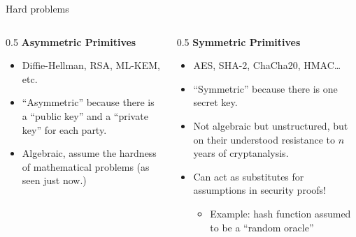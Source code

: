 \documentclass[aspectratio=169, lualatex, handout]{beamer}
\begin{document}
	\begin{frame}{Hard problems}
		\begin{columns}[c]
			\begin{column}{0.5\textwidth}
				\textbf{Asymmetric Primitives}
				\begin{itemize}
					\pause

					\item Diffie-Hellman, RSA, ML-KEM, etc. \pause

					\item ``Asymmetric'' because there is a ``public key'' and a ``private
						key'' for each party. \pause

					\item Algebraic, assume the hardness of mathematical problems (as seen
						just now.)
				\end{itemize}
			\end{column}

			\begin{column}{0.5\textwidth}
				\textbf{Symmetric Primitives}
				\begin{itemize}
					\pause

					\item AES, SHA-2, ChaCha20, HMAC\ldots \pause

					\item ``Symmetric'' because there is one secret key. \pause

					\item Not algebraic but unstructured, but on their understood
						resistance to $n$ years of cryptanalysis. \pause

					\item Can act as substitutes for assumptions in security proofs!
						\begin{itemize}
							\item Example: hash function assumed to be a ``random oracle''
						\end{itemize}
				\end{itemize}
			\end{column}
		\end{columns}
	\end{frame}
\end{document}
